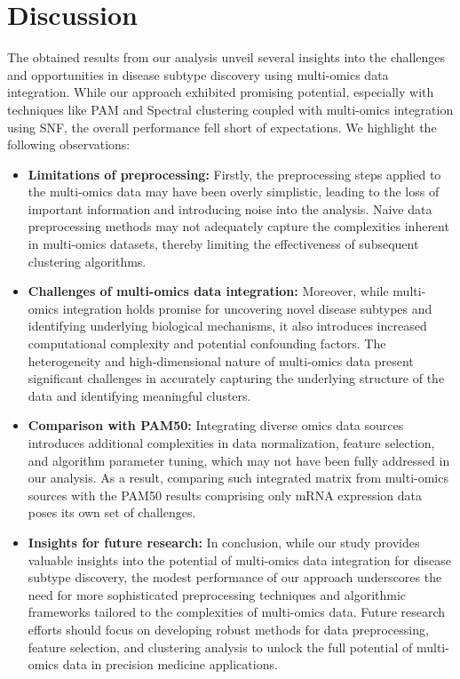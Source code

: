 
\section{Discussion}\label{sec:discussion}

The obtained results from our analysis unveil several insights into the challenges and opportunities in disease subtype discovery using multi-omics data integration. While our approach exhibited promising potential, especially with techniques like PAM and Spectral clustering coupled with multi-omics integration using SNF, the overall performance fell short of expectations. We highlight the following observations:

\begin{itemize}[]
    \item \textbf{Limitations of preprocessing:} Firstly, the preprocessing steps applied to the multi-omics data may have been overly simplistic, leading to the loss of important information and introducing noise into the analysis. Naive data preprocessing methods may not adequately capture the complexities inherent in multi-omics datasets, thereby limiting the effectiveness of subsequent clustering algorithms.
    
    \item \textbf{Challenges of multi-omics data integration:} Moreover, while multi-omics integration holds promise for uncovering novel disease subtypes and identifying underlying biological mechanisms, it also introduces increased computational complexity and potential confounding factors. The heterogeneity and high-dimensional nature of multi-omics data present significant challenges in accurately capturing the underlying structure of the data and identifying meaningful clusters.
    
    \item \textbf{Comparison with PAM50:} Integrating diverse omics data sources introduces additional complexities in data normalization, feature selection, and algorithm parameter tuning, which may not have been fully addressed in our analysis. As a result, comparing such integrated matrix from multi-omics sources with the PAM50 results comprising only mRNA expression data poses its own set of challenges.
    
    \item \textbf{Insights for future research:} In conclusion, while our study provides valuable insights into the potential of multi-omics data integration for disease subtype discovery, the modest performance of our approach underscores the need for more sophisticated preprocessing techniques and algorithmic frameworks tailored to the complexities of multi-omics data. Future research efforts should focus on developing robust methods for data preprocessing, feature selection, and clustering analysis to unlock the full potential of multi-omics data in precision medicine applications.
\end{itemize}
